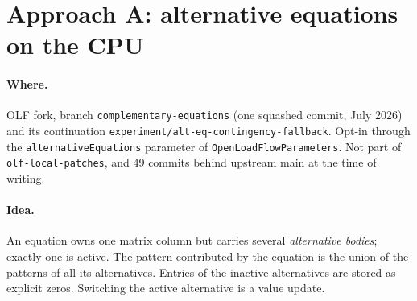 \documentclass[11pt,a4paper]{article}
\newcommand{\code}[1]{\texttt{\small #1}}
\begin{document}
\section{Approach A: alternative equations on the CPU}

\paragraph{Where.} OLF fork, branch \code{complementary-equations} (one squashed commit,
July 2026) and its continuation \code{experiment/alt-eq-contingency-fallback}. Opt-in
through the \code{alternativeEquations} parameter of \code{OpenLoadFlowParameters}. Not part of
\code{olf-local-patches}, and 49 commits behind upstream main at the time of writing.

\paragraph{Idea.} An equation owns one matrix column but carries several
\emph{alternative bodies}; exactly one is active. The pattern contributed by the equation
is the union of the patterns of all its alternatives. Entries of the inactive alternatives
are stored as explicit zeros. Switching the active alternative is a value update.
\end{document}

